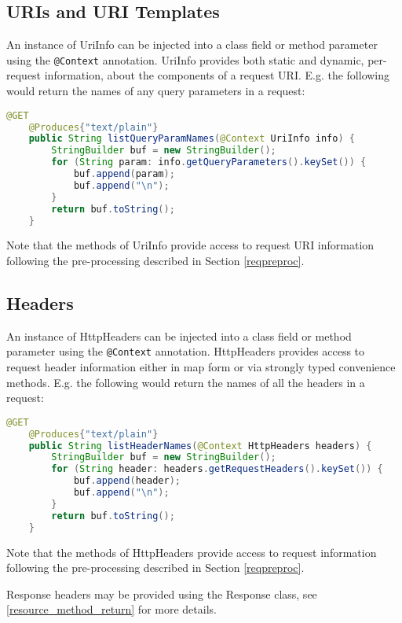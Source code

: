 \subsection{URIs and URI Templates}

An instance of UriInfo can be injected into a class field or method parameter using the \lstinline{@Context} annotation.
UriInfo provides both static and dynamic, per-request information, about the components of a request URI. E.g. the
following would return the names of any query parameters in a request:

\begin{lstlisting}[language=Java]
    @GET
    @Produces{"text/plain"}
    public String listQueryParamNames(@Context UriInfo info) {
        StringBuilder buf = new StringBuilder();
        for (String param: info.getQueryParameters().keySet()) {
            buf.append(param);
            buf.append("\n");
        }
        return buf.toString();
    }
\end{lstlisting}

Note that the methods of UriInfo provide access to request URI information following the pre-processing described in
Section \ref{reqpreproc}.

\subsection{Headers}
\label{httpheaders}

An instance of HttpHeaders can be injected into a class field or method parameter using the \lstinline{@Context}
annotation. HttpHeaders provides access to request header information either in map form or via strongly typed
convenience methods. E.g. the following would return the names of all the headers in a request:

\begin{lstlisting}[language=Java]
    @GET
    @Produces{"text/plain"}
    public String listHeaderNames(@Context HttpHeaders headers) {
        StringBuilder buf = new StringBuilder();
        for (String header: headers.getRequestHeaders().keySet()) {
            buf.append(header);
            buf.append("\n");
        }
        return buf.toString();
    }
\end{lstlisting}

Note that the methods of HttpHeaders provide access to request information following the pre-processing described in
Section \ref{reqpreproc}.

Response headers may be provided using the Response class, see \ref{resource_method_return} for more details.

